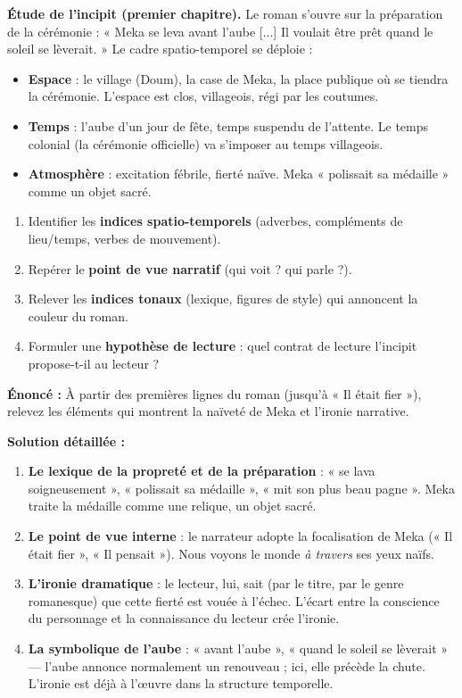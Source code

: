 \documentclass[11pt]{article}
\begin{document}
\textbf{Étude de l'incipit (premier chapitre).} Le roman s'ouvre sur la préparation de la cérémonie : « Meka se leva avant l'aube [...] Il voulait être prêt quand le soleil se lèverait. » Le cadre spatio-temporel se déploie :
\begin{itemize}
\item \textbf{Espace} : le village (Doum), la case de Meka, la place publique où se tiendra la cérémonie. L'espace est clos, villageois, régi par les coutumes.
\item \textbf{Temps} : l'aube d'un jour de fête, temps suspendu de l'attente. Le temps colonial (la cérémonie officielle) va s'imposer au temps villageois.
\item \textbf{Atmosphère} : excitation fébrile, fierté naïve. Meka « polissait sa médaille » comme un objet sacré.
\end{itemize}

\begin{methode}
\begin{enumerate}
\item Identifier les \textbf{indices spatio-temporels} (adverbes, compléments de lieu/temps, verbes de mouvement).
\item Repérer le \textbf{point de vue narratif} (qui voit ? qui parle ?).
\item Relever les \textbf{indices tonaux} (lexique, figures de style) qui annoncent la couleur du roman.
\item Formuler une \textbf{hypothèse de lecture} : quel contrat de lecture l'incipit propose-t-il au lecteur ?
\end{enumerate}
\end{methode}

\begin{exoresolu}
\textbf{Énoncé :} À partir des premières lignes du roman (jusqu'à « Il était fier »), relevez les éléments qui montrent la naïveté de Meka et l'ironie narrative.

\textbf{Solution détaillée :}
\begin{enumerate}
\item \textbf{Le lexique de la propreté et de la préparation} : « se lava soigneusement », « polissait sa médaille », « mit son plus beau pagne ». Meka traite la médaille comme une relique, un objet sacré.
\item \textbf{Le point de vue interne} : le narrateur adopte la focalisation de Meka (« Il était fier », « Il pensait »). Nous voyons le monde \emph{à travers} ses yeux naïfs.
\item \textbf{L'ironie dramatique} : le lecteur, lui, sait (par le titre, par le genre romanesque) que cette fierté est vouée à l'échec. L'écart entre la conscience du personnage et la connaissance du lecteur crée l'ironie.
\item \textbf{La symbolique de l'aube} : « avant l'aube », « quand le soleil se lèverait » — l'aube annonce normalement un renouveau ; ici, elle précède la chute. L'ironie est déjà à l'œuvre dans la structure temporelle.
\end{enumerate}
\end{exoresolu}
\end{document}
